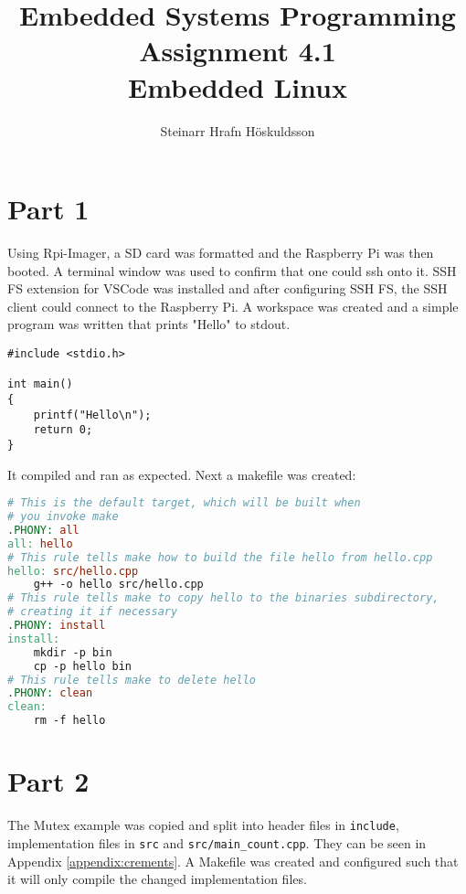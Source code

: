 \documentclass{article}
\title{Embedded Systems Programming \\ Assignment 4.1 \\ \large Embedded Linux}
\author{Steinarr Hrafn Höskuldsson}
\newcommand{\mycomment}[1]{}
\begin{document}
\pagestyle{firststyle}
{\let\newpage\relax\maketitle}

\mycomment{
\begin{figure}[h]
    \centering
    \texttt{[image: LAB3/Basic1.png]}
    \caption{"Switch test" Breadboard set up}
    \label{fig:Switch_test}
\end{figure}



}

\section*{Part 1}

Using Rpi-Imager, a SD card was formatted and the Raspberry Pi was then booted. A terminal window was used to confirm that one could ssh onto it. SSH FS extension for VSCode was installed and after configuring SSH FS, the SSH client could connect to the Raspberry Pi. A workspace was created and a simple program was written that prints "Hello" to stdout.

\begin{lstlisting}[caption={src/hello.cpp, writes "Hello" to stdout}]
#include <stdio.h>

int main()
{
    printf("Hello\n");
    return 0;
}
\end{lstlisting}

It compiled and ran as expected. Next a makefile was created:

\begin{lstlisting}[language=makefile, caption={Makefile for simple hello program}]
# This is the default target, which will be built when 
# you invoke make
.PHONY: all
all: hello
# This rule tells make how to build the file hello from hello.cpp
hello: src/hello.cpp
	g++ -o hello src/hello.cpp
# This rule tells make to copy hello to the binaries subdirectory,
# creating it if necessary
.PHONY: install
install:
	mkdir -p bin
	cp -p hello bin
# This rule tells make to delete hello 
.PHONY: clean 
clean:
	rm -f hello

\end{lstlisting}
\section*{Part 2}
The Mutex example was copied and split into header files in \verb!include!, implementation files in \verb!src! and \verb!src/main_count.cpp!. They can be seen in Appendix \ref{appendix:crements}. A Makefile was created and configured such that it will only compile the changed implementation files.
\end{document}
